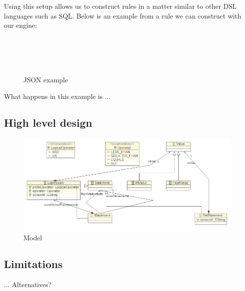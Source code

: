 Using this setup allows us to construct rules in a matter similar to other DSL languages such as SQL. Below is an example from a rule we can construct with our engine:
\\
\\
\\
\\
\\
%
%
%


\begin{figure}[t]
%

\caption{JSON example\label{json-example}}
\end{figure}


What happens in this example is ...

\subsection{High level design}

\begin{figure}[t]
\includegraphics[width=1.00\columnwidth]{model.png}
\caption{Model}
\end{figure}


\subsection{Limitations}
... Alternatives?